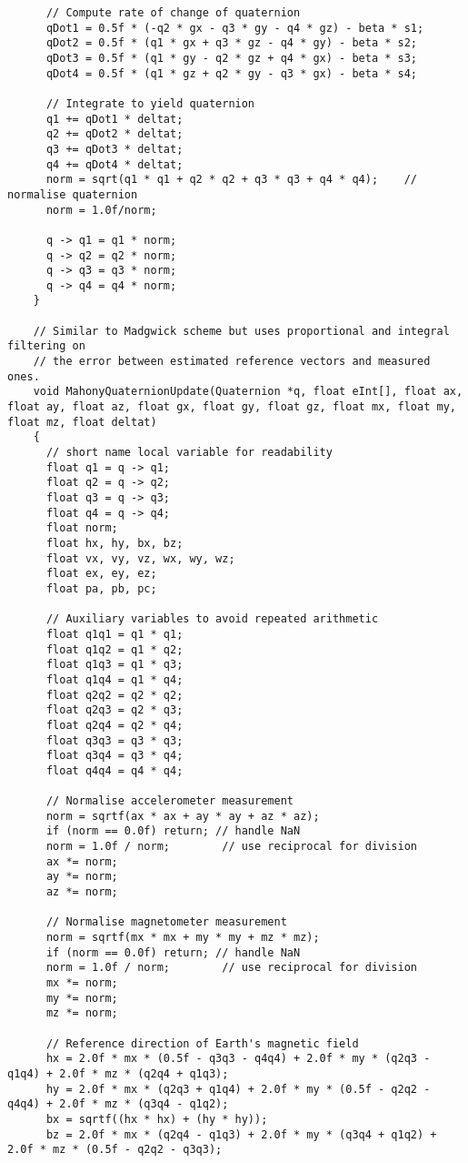 \begin{lstlisting}
	  // Compute rate of change of quaternion
	  qDot1 = 0.5f * (-q2 * gx - q3 * gy - q4 * gz) - beta * s1;
	  qDot2 = 0.5f * (q1 * gx + q3 * gz - q4 * gy) - beta * s2;
	  qDot3 = 0.5f * (q1 * gy - q2 * gz + q4 * gx) - beta * s3;
	  qDot4 = 0.5f * (q1 * gz + q2 * gy - q3 * gx) - beta * s4;

	  // Integrate to yield quaternion
	  q1 += qDot1 * deltat;
	  q2 += qDot2 * deltat;
	  q3 += qDot3 * deltat;
	  q4 += qDot4 * deltat;
	  norm = sqrt(q1 * q1 + q2 * q2 + q3 * q3 + q4 * q4);    // normalise quaternion
	  norm = 1.0f/norm;

	  q -> q1 = q1 * norm;
	  q -> q2 = q2 * norm;
	  q -> q3 = q3 * norm;
	  q -> q4 = q4 * norm;
	}

	// Similar to Madgwick scheme but uses proportional and integral filtering on
	// the error between estimated reference vectors and measured ones.
	void MahonyQuaternionUpdate(Quaternion *q, float eInt[], float ax, float ay, float az, float gx, float gy, float gz, float mx, float my, float mz, float deltat)
	{
	  // short name local variable for readability
	  float q1 = q -> q1;
	  float q2 = q -> q2;
	  float q3 = q -> q3;
	  float q4 = q -> q4;
	  float norm;
	  float hx, hy, bx, bz;
	  float vx, vy, vz, wx, wy, wz;
	  float ex, ey, ez;
	  float pa, pb, pc;

	  // Auxiliary variables to avoid repeated arithmetic
	  float q1q1 = q1 * q1;
	  float q1q2 = q1 * q2;
	  float q1q3 = q1 * q3;
	  float q1q4 = q1 * q4;
	  float q2q2 = q2 * q2;
	  float q2q3 = q2 * q3;
	  float q2q4 = q2 * q4;
	  float q3q3 = q3 * q3;
	  float q3q4 = q3 * q4;
	  float q4q4 = q4 * q4;   

	  // Normalise accelerometer measurement
	  norm = sqrtf(ax * ax + ay * ay + az * az);
	  if (norm == 0.0f) return; // handle NaN
	  norm = 1.0f / norm;        // use reciprocal for division
	  ax *= norm;
	  ay *= norm;
	  az *= norm;

	  // Normalise magnetometer measurement
	  norm = sqrtf(mx * mx + my * my + mz * mz);
	  if (norm == 0.0f) return; // handle NaN
	  norm = 1.0f / norm;        // use reciprocal for division
	  mx *= norm;
	  my *= norm;
	  mz *= norm;

	  // Reference direction of Earth's magnetic field
	  hx = 2.0f * mx * (0.5f - q3q3 - q4q4) + 2.0f * my * (q2q3 - q1q4) + 2.0f * mz * (q2q4 + q1q3);
	  hy = 2.0f * mx * (q2q3 + q1q4) + 2.0f * my * (0.5f - q2q2 - q4q4) + 2.0f * mz * (q3q4 - q1q2);
	  bx = sqrtf((hx * hx) + (hy * hy));
	  bz = 2.0f * mx * (q2q4 - q1q3) + 2.0f * my * (q3q4 + q1q2) + 2.0f * mz * (0.5f - q2q2 - q3q3);


\end{lstlisting}

